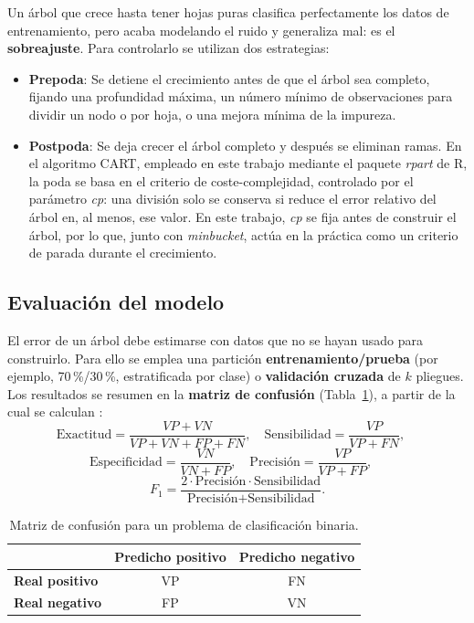\documentclass[twoside,a4paper,12pt,onecolumn,openany]{book}
\begin{document}
Un árbol que crece hasta tener hojas puras clasifica perfectamente los datos de entrenamiento, pero acaba modelando el ruido y generaliza mal: es el \textbf{sobreajuste}. Para controlarlo se utilizan dos estrategias:
\begin{itemize}

    \item \textbf{Prepoda}: Se detiene el crecimiento antes de que el árbol sea completo, fijando una profundidad máxima, un número mínimo de observaciones para dividir un nodo o por hoja, o una mejora mínima de la impureza. \cite{tema3_clasificacion}
    
    \item \textbf{Postpoda}: Se deja crecer el árbol completo y después se eliminan ramas. En el algoritmo CART, empleado en este trabajo mediante el paquete \textit{rpart} de R, la poda se basa en el criterio de coste-complejidad, controlado por el parámetro \textit{cp}: una división solo se conserva si reduce el error relativo del árbol en, al menos, ese valor. En este trabajo, \textit{cp} se fija antes de construir el árbol, por lo que, junto con \textit{minbucket}, actúa en la práctica como un criterio de parada durante el crecimiento. 
    
\end{itemize}


\subsection{Evaluación del modelo}
 
El error de un árbol debe estimarse con datos que no se hayan usado para construirlo. Para ello se emplea una partición \textbf{entrenamiento/prueba} (por ejemplo, 70\,\%/30\,\%, estratificada por clase) o \textbf{validación cruzada} de $k$ pliegues. Los resultados se resumen en la \textbf{matriz de confusión} (Tabla~\ref{tab:confusion}), a partir de la cual se calculan \cite{tema3_clasificacion}:
\[
\text{Exactitud}=\frac{VP+VN}{VP+VN+FP+FN},\quad
\text{Sensibilidad}=\frac{VP}{VP+FN},\quad
\]
\[
\text{Especificidad}=\frac{VN}{VN+FP},\quad
\text{Precisión}=\frac{VP}{VP+FP},\quad
\]
\[F_1=\frac{2\cdot\text{Precisión}\cdot\text{Sensibilidad}}{\text{Precisión}+\text{Sensibilidad}}.
\]
 
\begin{table}[ht]
\centering
\begin{tabular}{l|cc}
 & \textbf{Predicho positivo} & \textbf{Predicho negativo} \\ \hline
\textbf{Real positivo} & VP & FN \\
\textbf{Real negativo} & FP & VN \\
\end{tabular}
\caption{Matriz de confusión para un problema de clasificación binaria.}
\label{tab:confusion}
\end{table}
 
\end{document}
